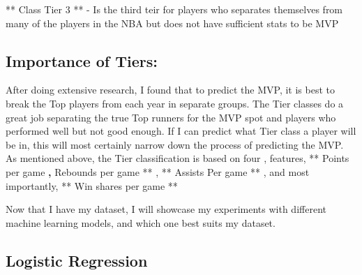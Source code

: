 \documentclass[11pt]{article}
\begin{document}
** Class Tier 3 ** - Is the third teir for players who separates
themselves from many of the players in the NBA but does not have
sufficient stats to be MVP

\subsection{Importance of Tiers:}\label{importance-of-tiers}

After doing extensive research, I found that to predict the MVP, it is
best to break the Top players from each year in separate groups. The
Tier classes do a great job separating the true Top runners for the MVP
spot and players who performed well but not good enough. If I can
predict what Tier class a player will be in, this will most certainly
narrow down the process of predicting the MVP. As mentioned above, the
Tier classification is based on four , features, ** Points per game
\textbf{, } Rebounds per game ** , ** Assists Per game ** , and most
importantly, ** Win shares per game **

Now that I have my dataset, I will showcase my experiments with
different machine learning models, and which one best suits my dataset.

    \subsection{Logistic Regression}\label{logistic-regression}
\end{document}
